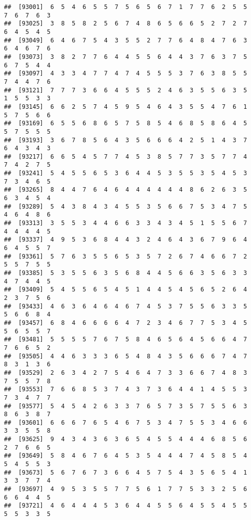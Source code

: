 \documentclass[
]{book}
\begin{document}
\begin{verbatim}
##  [93001]  6  5  4  6  5  5  7  5  6  5  6  7  1  7  7  6  2  5  5  7  6  7  6  3
##  [93025]  3  8  5  8  2  5  6  7  4  8  6  5  6  6  5  2  7  2  7  6  4  5  4  5
##  [93049]  6  4  6  7  5  4  3  5  5  2  7  7  6  4  8  4  7  6  3  6  4  6  7  6
##  [93073]  3  8  2  7  7  6  4  4  5  5  6  4  4  3  7  6  3  7  5  6  7  5  4  4
##  [93097]  4  3  3  4  7  7  4  7  4  5  5  5  3  7  6  3  8  5  5  7  4  4  7  6
##  [93121]  7  7  7  3  6  6  4  5  5  5  2  4  6  3  5  5  6  3  5  1  5  5  3  3
##  [93145]  6  6  2  5  7  4  5  9  5  4  6  4  3  5  5  4  7  6  1  5  7  5  6  6
##  [93169]  6  5  5  6  8  6  5  7  5  8  5  4  6  8  5  8  6  4  5  5  7  5  5  5
##  [93193]  3  6  7  8  5  6  4  3  5  6  6  6  4  2  5  1  4  3  7  6  4  3  4  3
##  [93217]  6  6  5  4  5  7  7  4  5  3  8  5  7  7  3  5  7  7  4  7  4  2  7  5
##  [93241]  5  4  5  5  6  5  3  6  4  4  5  3  5  5  3  5  4  5  3  7  3  4  6  5
##  [93265]  8  4  4  7  6  4  6  4  4  4  4  4  4  8  6  2  6  3  5  6  3  4  5  4
##  [93289]  5  4  3  8  4  3  4  5  5  3  5  6  6  7  5  3  4  7  5  4  6  4  8  6
##  [93313]  3  5  5  3  4  4  6  6  3  3  4  3  4  5  1  5  5  6  7  4  4  4  4  5
##  [93337]  4  9  5  3  6  8  4  4  3  2  4  6  4  3  6  7  9  6  4  6  4  5  5  7
##  [93361]  5  7  6  3  5  5  6  5  3  5  7  2  6  7  4  6  6  7  2  5  5  7  5  5
##  [93385]  5  3  5  5  6  3  5  6  8  4  4  5  6  6  3  5  6  3  3  4  7  4  4  5
##  [93409]  5  4  5  5  6  5  4  5  1  4  4  5  4  5  6  5  2  6  4  2  3  7  5  6
##  [93433]  4  6  3  6  4  6  4  6  7  4  5  3  7  5  5  6  3  3  5  5  6  6  8  4
##  [93457]  6  8  4  6  6  6  6  4  7  2  3  4  6  7  7  5  3  4  5  5  6  5  5  7
##  [93481]  5  5  5  5  7  6  7  5  8  4  6  5  6  4  5  6  6  4  7  7  6  6  5  2
##  [93505]  4  4  6  3  3  3  6  5  4  8  4  3  5  6  6  6  7  4  7  8  3  1  3  6
##  [93529]  2  6  3  4  2  7  5  4  6  4  7  3  3  6  6  7  4  8  3  7  5  5  7  8
##  [93553]  7  6  6  8  5  3  7  4  3  7  3  6  4  4  1  4  5  5  3  7  3  4  7  7
##  [93577]  5  4  5  4  2  6  3  3  7  6  5  7  3  5  7  5  5  6  3  8  6  3  8  7
##  [93601]  6  6  6  7  6  5  4  6  7  5  3  4  7  5  5  3  4  6  6  3  3  5  5  8
##  [93625]  9  4  3  4  3  6  3  6  5  4  5  5  4  4  4  6  8  5  6  2  7  6  6  5
##  [93649]  5  8  4  6  7  6  4  5  3  5  4  4  4  7  4  5  8  5  4  5  4  5  5  3
##  [93673]  5  6  7  6  7  3  6  6  4  5  7  5  4  3  5  6  5  4  1  3  3  7  7  4
##  [93697]  4  9  5  3  5  5  7  7  5  6  1  7  7  5  3  3  2  5  6  6  6  4  4  5
##  [93721]  4  6  4  4  4  5  3  6  4  4  5  5  6  4  5  5  4  5  5  5  5  3  3  5

\end{verbatim}
\end{document}
